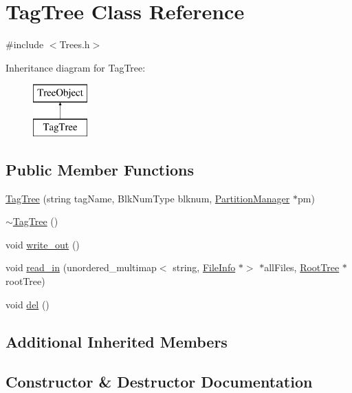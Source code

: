 \hypertarget{class_tag_tree}{}\section{Tag\+Tree Class Reference}
\label{class_tag_tree}


{\ttfamily \#include $<$Trees.\+h$>$}

Inheritance diagram for Tag\+Tree\+:\begin{figure}[H]
\begin{center}
\leavevmode
\includegraphics[height=2.000000cm]{class_tag_tree}
\end{center}
\end{figure}
\subsection*{Public Member Functions}
\begin{DoxyCompactItemize}
\item 
\mbox{\hyperlink{class_tag_tree_a80b23fa47a18727a248c3db1e8b2ed83}{Tag\+Tree}} (string tag\+Name, Blk\+Num\+Type blknum, \mbox{\hyperlink{class_partition_manager}{Partition\+Manager}} $\ast$pm)
\item 
\mbox{\hyperlink{class_tag_tree_a0522ae8933fa3e903fc1da7bdfb5d901}{$\sim$\+Tag\+Tree}} ()
\item 
void \mbox{\hyperlink{class_tag_tree_adf13e01b25991ecfef1ad958e02c07fe}{write\+\_\+out}} ()
\item 
void \mbox{\hyperlink{class_tag_tree_af86ee6713fa03c3909e04608512b8b62}{read\+\_\+in}} (unordered\+\_\+multimap$<$ string, \mbox{\hyperlink{class_file_info}{File\+Info}} $\ast$$>$ $\ast$all\+Files, \mbox{\hyperlink{class_root_tree}{Root\+Tree}} $\ast$root\+Tree)
\item 
void \mbox{\hyperlink{class_tag_tree_ad8108969f4d28b938e55c8339f19db35}{del}} ()
\end{DoxyCompactItemize}
\subsection*{Additional Inherited Members}


\subsection{Constructor \& Destructor Documentation}
\mbox{\label{class_tag_tree_a80b23fa47a18727a248c3db1e8b2ed83}} 

